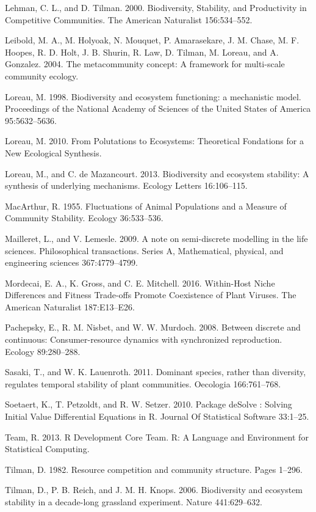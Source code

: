 \documentclass[12pt,]{article}
\begin{document}
Lehman, C. L., and D. Tilman. 2000. Biodiversity, Stability, and
Productivity in Competitive Communities. The American Naturalist
156:534--552.

Leibold, M. A., M. Holyoak, N. Mouquet, P. Amarasekare, J. M. Chase, M.
F. Hoopes, R. D. Holt, J. B. Shurin, R. Law, D. Tilman, M. Loreau, and
A. Gonzalez. 2004. The metacommunity concept: A framework for
multi-scale community ecology.

Loreau, M. 1998. Biodiversity and ecosystem functioning: a mechanistic
model. Proceedings of the National Academy of Sciences of the United
States of America 95:5632--5636.

Loreau, M. 2010. From Polutations to Ecosystems: Theoretical Fondations
for a New Ecological Synthesis.

Loreau, M., and C. {{de Mazancourt}}. 2013. Biodiversity and ecosystem
stability: A synthesis of underlying mechanisms. Ecology Letters
16:106--115.

MacArthur, R. 1955. Fluctuations of Animal Populations and a Measure of
Community Stability. Ecology 36:533--536.

Mailleret, L., and V. Lemesle. 2009. A note on semi-discrete modelling
in the life sciences. Philosophical transactions. Series A,
Mathematical, physical, and engineering sciences 367:4779--4799.

Mordecai, E. A., K. Gross, and C. E. Mitchell. 2016. Within-Host Niche
Differences and Fitness Trade-offs Promote Coexistence of Plant Viruses.
The American Naturalist 187:E13--E26.

Pachepsky, E., R. M. Nisbet, and W. W. Murdoch. 2008. Between discrete
and continuous: Consumer-resource dynamics with synchronized
reproduction. Ecology 89:280--288.

Sasaki, T., and W. K. Lauenroth. 2011. Dominant species, rather than
diversity, regulates temporal stability of plant communities. Oecologia
166:761--768.

Soetaert, K., T. Petzoldt, and R. W. Setzer. 2010. Package deSolve :
Solving Initial Value Differential Equations in R. Journal Of
Statistical Software 33:1--25.

Team, R. 2013. R Development Core Team. R: A Language and Environment
for Statistical Computing.

Tilman, D. 1982. Resource competition and community structure. Pages
1--296.

Tilman, D., P. B. Reich, and J. M. H. Knops. 2006. Biodiversity and
ecosystem stability in a decade-long grassland experiment. Nature
441:629--632.
\end{document}
